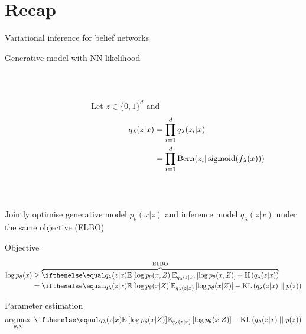 

\section{Recap}


\begin{frame}{Variational inference for belief networks}

Generative model with NN likelihood

~

\begin{columns}
	\begin{column}{0.2\textwidth}
    \end{column}
    \begin{column}{0.7\textwidth}
			Let $z \in \{0, 1\}^d$ and
			\begin{equation}
			\begin{aligned}
			q_\lambda(z|x) &= \prod_{i=1}^d q_\lambda(z_i|x) \\
				&= \prod_{i=1}^d \operatorname{Bern}(z_i|\operatorname{sigmoid}(f_\lambda(x)))
			\end{aligned}
			\end{equation}
    \end{column}
    \end{columns}
    ~
    
    Jointly optimise generative model $p_\theta(x|z)$ and inference model $q_\lambda(z|x)$ under the same objective (ELBO)
    
\end{frame}


\begin{frame}{Objective}

\begin{equation*}
\begin{aligned}
\log p_\theta(x) &\geq \overbrace{\E[q_\lambda(z|x)]{\log p_\theta(x,Z)} + \Ent{q_\lambda(z|x)}}^{\ELBO} \\ 
&= \E[q_\lambda(z|x)]{\log p_\theta(x|Z)} - \KL{q_\lambda(z|x)}{p(z)}
\end{aligned}
\end{equation*}


Parameter estimation
\begin{equation*}
\argmax_{\theta,\lambda} ~ \E[q_\lambda(z|x)]{\log p_\theta(x|Z)} - \KL{q_\lambda(z|x)}{p(z)}
\end{equation*}


\end{frame}

